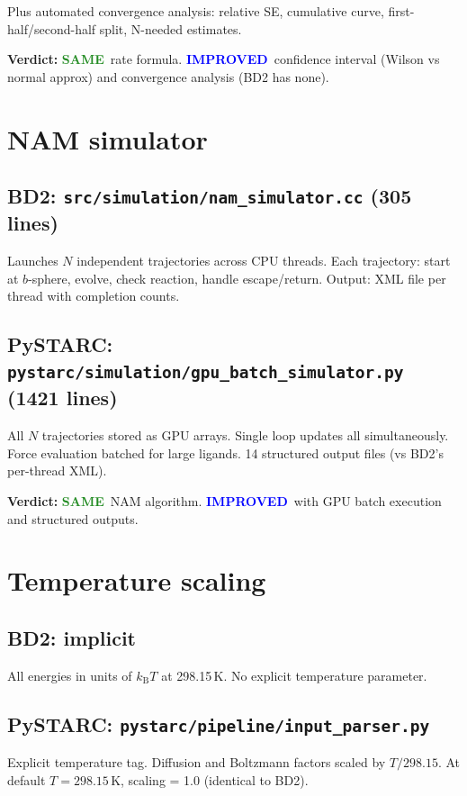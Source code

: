 \documentclass[11pt]{article}
\newcommand{\kBT}{k_{\mathrm{B}}T}
\newcommand{\same}{\textcolor{ForestGreen}{\textbf{SAME}}}
\newcommand{\improved}{\textcolor{Blue}{\textbf{IMPROVED}}}
\begin{document}
Plus automated convergence analysis: relative SE, cumulative curve,
first-half/second-half split, N-needed estimates.

\textbf{Verdict:} \same\ rate formula. \improved\ confidence interval
(Wilson vs normal approx) and convergence analysis (BD2 has none).


\section{NAM simulator}

\subsection{BD2: \texttt{src/simulation/nam\_simulator.cc} (305 lines)}
Launches $N$ independent trajectories across CPU threads.
Each trajectory: start at $b$-sphere, evolve, check reaction, handle escape/return.
Output: XML file per thread with completion counts.

\subsection{PySTARC: \texttt{pystarc/simulation/gpu\_batch\_simulator.py} (1421 lines)}
All $N$ trajectories stored as GPU arrays. Single loop updates all simultaneously.
Force evaluation batched for large ligands.
14 structured output files (vs BD2's per-thread XML).

\textbf{Verdict:} \same\ NAM algorithm. \improved\ with GPU batch execution
and structured outputs.


\section{Temperature scaling}

\subsection{BD2: implicit}
All energies in units of $\kBT$ at 298.15\,K. No explicit temperature parameter.

\subsection{PySTARC: \texttt{pystarc/pipeline/input\_parser.py}}
Explicit temperature tag. Diffusion and Boltzmann factors scaled by
$T/298.15$. At default $T = 298.15$\,K, scaling = 1.0 (identical to BD2).
\end{document}
